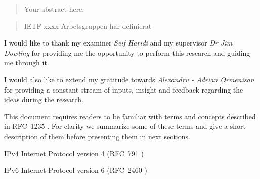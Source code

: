 \documentclass[12pt,a4paper,twoside,openright]{book}
\begin{document}
\frontmatter
{}
\begin{abstract}
\label{sec:abstract}
\setcounter{page}{1}


Your abstract here.

\end{abstract}
{}
\begin{abstract}
\label{sec:swedish_abstract}


IETF xxxx Arbetsgruppen har definierat 
\end{abstract}

\begin{acknowledgements}
I would like to thank my examiner \textit{Seif Haridi} and my supervisor \textit{Dr Jim Dowling} for providing me the opportunity to perform this research and guiding me through it.
\par I would also like to extend my gratitude towards \textit{Alexandru - Adrian Ormenisan} for providing a constant stream of inputs, insight and feedback regarding the ideas during the research.

\end{acknowledgements}

\tableofcontents

\listoffigures

\listoftables

\listoflistings


\renewcommand\abbreviationsname{List of Acronyms and Abbreviations}
\begin{abbreviations}
\label{list-of-acronyms-and-abbreviations}

This document requires readers to be familiar with terms and concepts described in \mbox{RFC~1235} \cite{john_ioannidis_coherent_1991}. For clarity we summarize some of these terms and give a short description of them before presenting them in next sections.

\begin{basedescript}{\desclabelstyle{\pushlabel}\desclabelwidth{10em}}
\item[IPv4]					Internet Protocol version 4 (RFC~791 \cite{postel_internet_1981})
\item[IPv6]					Internet Protocol version 6 (RFC~2460 \cite{deering_internet_1998})
\end{basedescript}
\end{abbreviations}
\end{document}
